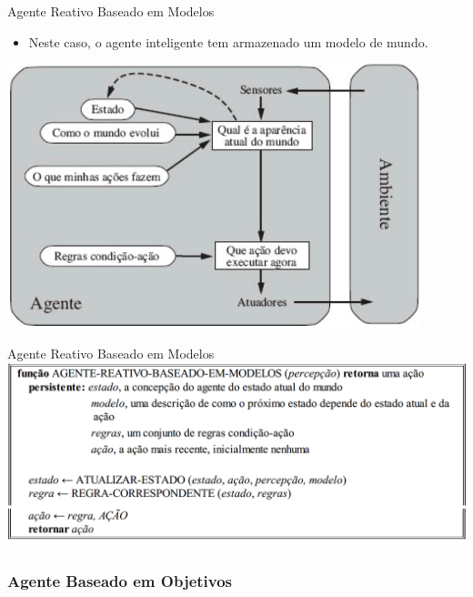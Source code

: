 \documentclass{libs/ufc_format}
\begin{document}
\begin{frame}{Agente Reativo Baseado em Modelos}
    \begin{itemize}
        \justifying
        \item Neste caso, o agente inteligente tem armazenado um modelo de mundo.
    \end{itemize}
    \centering
    \includegraphics[width=0.9\textwidth]{figuras/figura05}
\end{frame}

\begin{frame}{Agente Reativo Baseado em Modelos}
    \centering
    \includegraphics[width=\textwidth]{figuras/figura05_01}
\end{frame}

\subsubsection{Agente Baseado em Objetivos}
\end{document}
